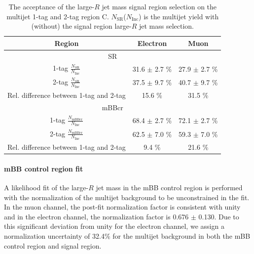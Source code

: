 \begin{table}[!htbp]
\begin{center}
\begin{tabular}{c|c|c}
\hline
Region    & Electron          & Muon      \\
\hline
\multicolumn{3}{c}{SR} \\
\hline
1-tag $\frac{N_\text{SR}}{N_\text{Inc}}$ &  31.6 $\pm$ 2.7 \% & 27.9 $\pm$ 2.7 \% \\
2-tag $\frac{N_\text{SR}}{N_\text{Inc}}$ &  37.5 $\pm$ 9.7 \% & 40.7 $\pm$ 9.7 \% \\
\hline \hline
Rel. difference between 1-tag and 2-tag & 15.6 \% & 31.5 \% \\
\hline
\multicolumn{3}{c}{mBBcr} \\
\hline
1-tag $\frac{N_\text{mBBcr}}{N_\text{Inc}}$ &  68.4 $\pm$ 2.7  \% & 72.1 $\pm$ 2.7 \% \\
2-tag $\frac{N_\text{mBBcr}}{N_\text{Inc}}$ &  62.5 $\pm$ 7.0  \% & 59.3 $\pm$ 7.0 \% \\
\hline \hline
Rel. difference between 1-tag and 2-tag &  9.4 \% &   21.6 \% \\
\end{tabular}
\end{center}
\caption{The acceptance of the large-$R$ jet mass signal region selection on the multijet
1-tag and 2-tag region C. $N_\text{SR}$($N_\text{Inc}$) is the multijet yield
with (without) the signal region large-$R$ jet mass selection.}
\label{tab:boosted_syst_qcd_norm_mBBAcc}
\end{table}
 
\paragraph{mBB control region fit} 
 A likelihood fit of the large-$R$ jet mass in the mBB control region
is performed with the normalization of the multijet background to be unconstrained in the fit.
In the muon channel,
the post-fit normalization factor is consistent with unity and in the electron channel,
the normalization factor is 0.676 $\pm$ 0.130. Due to this significant deviation from unity for the electron channel,
we assign a normalization uncertainty of 32.4\% for the multijet background in both the mBB control
region and signal region.
 
